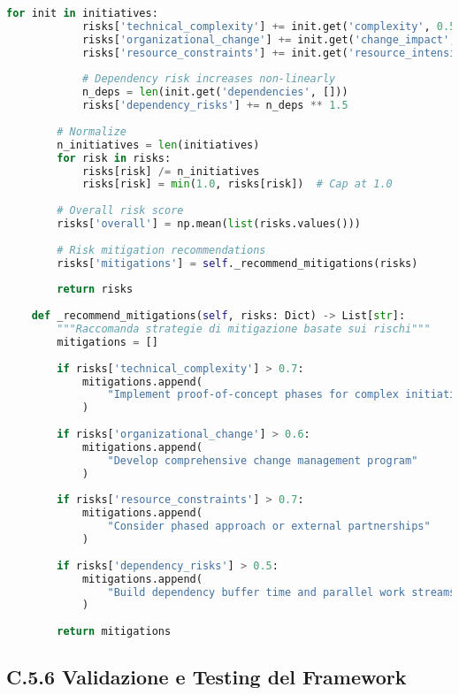\begin{lstlisting}[language=Python, caption=Generazione Roadmap Ottimizzata GIST]
        for init in initiatives:
            risks['technical_complexity'] += init.get('complexity', 0.5)
            risks['organizational_change'] += init.get('change_impact', 0.5)
            risks['resource_constraints'] += init.get('resource_intensity', 0.5)
            
            # Dependency risk increases non-linearly
            n_deps = len(init.get('dependencies', []))
            risks['dependency_risks'] += n_deps ** 1.5
        
        # Normalize
        n_initiatives = len(initiatives)
        for risk in risks:
            risks[risk] /= n_initiatives
            risks[risk] = min(1.0, risks[risk])  # Cap at 1.0
        
        # Overall risk score
        risks['overall'] = np.mean(list(risks.values()))
        
        # Risk mitigation recommendations
        risks['mitigations'] = self._recommend_mitigations(risks)
        
        return risks
    
    def _recommend_mitigations(self, risks: Dict) -> List[str]:
        """Raccomanda strategie di mitigazione basate sui rischi"""
        mitigations = []
        
        if risks['technical_complexity'] > 0.7:
            mitigations.append(
                "Implement proof-of-concept phases for complex initiatives"
            )
            
        if risks['organizational_change'] > 0.6:
            mitigations.append(
                "Develop comprehensive change management program"
            )
            
        if risks['resource_constraints'] > 0.7:
            mitigations.append(
                "Consider phased approach or external partnerships"
            )
            
        if risks['dependency_risks'] > 0.5:
            mitigations.append(
                "Build dependency buffer time and parallel work streams"
            )
        
        return mitigations
\end{lstlisting}

\subsection{\texorpdfstring{\textbf{C.5.6 Validazione e Testing del Framework}}{C.5.6 - Validazione e Testing del Framework}}

